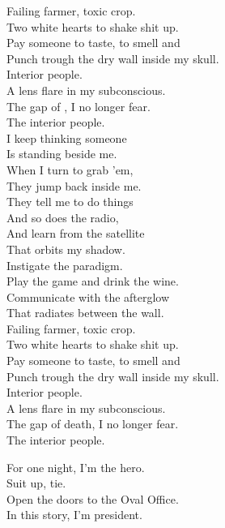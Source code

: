 Failing farmer, toxic crop. \\
Two white hearts to shake shit up. \\
Pay someone to taste, to smell and \\
Punch trough the dry wall inside my skull. \\

Interior people. \\
A lens flare in my subconscious. \\
The gap of , I no longer fear. \\
The interior people. \\

I keep thinking someone \\
Is standing beside me. \\
When I turn to grab 'em, \\
They jump back inside me. \\
They tell me to do things \\
And so does the radio, \\
And learn from the satellite \\
That orbits my shadow. \\

Instigate the paradigm. \\
Play the game and drink the wine. \\
Communicate with the afterglow \\
That radiates between the wall. \\

Failing farmer, toxic crop. \\
Two white hearts to shake shit up. \\
Pay someone to taste, to smell and \\
Punch trough the dry wall inside my skull. \\

Interior people. \\
A lens flare in my subconscious. \\
The gap of death, I no longer fear. \\
The interior people. \\





For one night, I'm the hero. \\
Suit up, tie. \\
Open the doors to the Oval Office. \\
In this story, I'm president. \\

